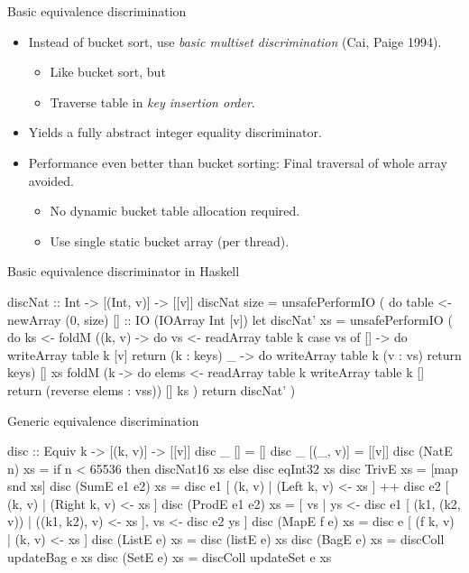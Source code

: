 \documentclass{beamer}
\begin{document}
\begin{frame}{Basic equivalence discrimination}
  \begin{itemize}
  \item Instead of bucket sort, use \emph{basic multiset discrimination}
    (Cai, Paige 1994).
    \begin{itemize}
    \item Like bucket sort, but
    \item Traverse table in \emph{key insertion order}.
    \end{itemize}
  \item Yields a fully abstract integer equality discriminator.
  \item Performance even better than bucket sorting: Final traversal of
    whole array avoided.
    \begin{itemize}
    \item No dynamic bucket table allocation required.
    \item Use single static bucket array (per thread).
    \end{itemize}
  \end{itemize}
\end{frame}

\begin{frame}[fragile]{Basic equivalence discriminator in Haskell}
\begin{haskell}[style=long]
discNat :: Int -> [(Int, v)] -> [[v]]
discNat size =
  unsafePerformIO (
  do table <- newArray (0, size) [] :: IO (IOArray Int [v])
     let discNat' xs = unsafePerformIO (
         do ks <- foldM (\keys (k, v) ->
                  do vs <- readArray table k
                     case vs of [] -> do writeArray table k [v]
                                         return (k : keys)
                          _ ->  do writeArray table k (v : vs)
                                   return keys)
                            [] xs
             foldM (\vss k -> do elems <- readArray table k
                                 writeArray table k []
                                 return (reverse elems : vss))
                       [] ks )
     return discNat' )
\end{haskell}
\end{frame}

\begin{frame}[fragile]{Generic equivalence discrimination}
\begin{haskell}[style=long]
disc :: Equiv k -> [(k, v)] -> [[v]]
disc _ []            = []
disc _ [(_, v)]      = [[v]]
disc (NatE n) xs     =
   if n < 65536 then discNat16 xs else disc eqInt32 xs
disc TrivE xs        = [map snd xs]
disc (SumE e1 e2) xs = disc e1 [ (k, v) | (Left k, v) <- xs ] ++
                        disc e2 [ (k, v) | (Right k, v) <- xs ]
disc (ProdE e1 e2) xs =
  [ vs | ys <- disc e1 [ (k1, (k2, v)) | ((k1, k2), v) <- xs ],
         vs <- disc e2 ys ]
disc (MapE f e) xs   = disc e [ (f k, v) | (k, v) <- xs ]
disc (ListE e) xs    = disc (listE e) xs
disc (BagE e) xs     = discColl updateBag e xs
disc (SetE e) xs     = discColl updateSet e xs
\end{haskell}
\end{frame}
\end{document}
